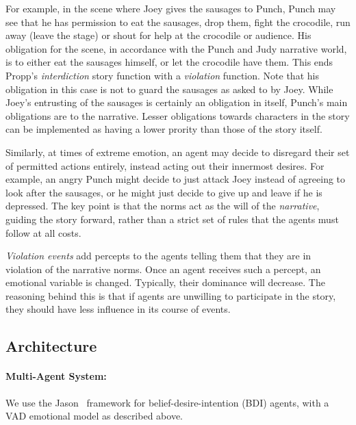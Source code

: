 \documentclass[11pt]{report}
\begin{document}
For example, in the scene where Joey gives the sausages to Punch, Punch may see that he has permission to eat the sausages, drop them, fight the crocodile, run away (leave the stage) or shout for help at the crocodile or audience. His obligation for the scene, in accordance with the Punch and Judy narrative world, is to either eat the sausages himself, or let the crocodile have them. This ends Propp's \emph{interdiction\/} story function with a \emph{violation\/} function. Note that his obligation in this case is not to guard the sausages as asked to by Joey. While Joey's entrusting of the sausages is certainly an obligation in itself, Punch's main obligations are to the narrative. Lesser obligations towards characters in the story can be implemented as having a lower prority than those of the story itself.

Similarly, at times of extreme emotion, an agent may decide to disregard their set of permitted actions entirely, instead acting out their innermost desires. For example, an angry Punch might decide to just attack Joey instead of agreeing to look after the sausages, or he might just decide to give up and leave if he is depressed. The key point is that the norms act as the will of the \emph{narrative}, guiding the story forward, rather than a strict set of rules that the agents must follow at all costs.

\emph{Violation events\/} add percepts to the agents telling them that they are in violation of the narrative norms. Once an agent receives such a percept, an emotional variable is changed. Typically, their dominance will decrease. The reasoning behind this is that if agents are unwilling to participate in the story, they should have less influence in its course of events.

\subsection{Architecture}\label{sec:arch}

\paragraph{Multi-Agent System:} \label{sec:arch-mas}
We use the Jason~\citep{bordini2007programming} framework for belief-desire-intention (BDI) agents, with a VAD
emotional model as described above.
\end{document}

